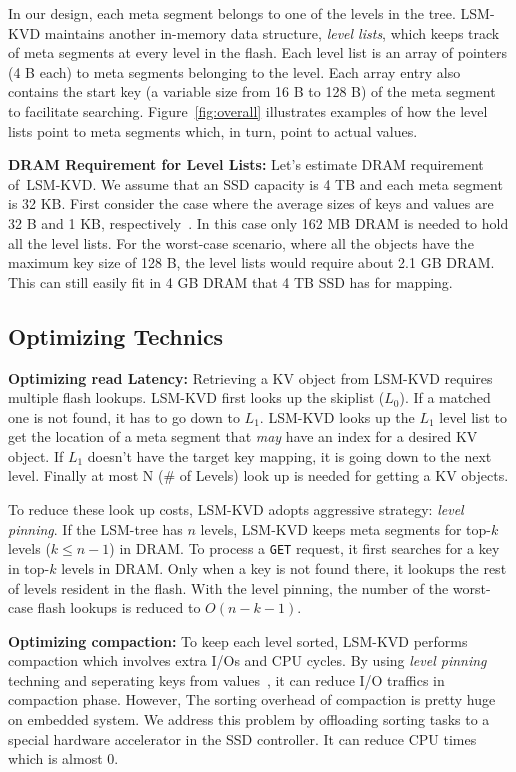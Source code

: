 \documentclass{abstract_hutech}
\newcommand{\ours}{LSM-KVD}
\begin{document}
In our design, each meta segment belongs to one of the levels in the tree.
\ours{} maintains another in-memory data structure, \textit{level lists}, which
keeps track of meta segments at every level in the flash.  Each level list is
an array of pointers (4 B each) to meta segments belonging to the level.  Each array
entry also contains the start key (a variable size from 16 B to 128 B) of the meta segment to facilitate searching.
Figure~\ref{fig:overall} illustrates examples of how the level lists point to
meta segments which, in turn, point to actual values.

\textbf{DRAM Requirement for Level Lists:}
Let's estimate DRAM requirement of~\ours{}.  We assume that an
SSD capacity is 4 TB and each meta segment is 32 KB. First 
consider the case where the average sizes of keys and values are 32 B and 1 KB,
respectively~\cite{kvsize}. In this case only 162 MB DRAM is needed to hold all the level lists.
For the
worst-case scenario, where all the objects have the maximum key size of 128 B,
the level lists would require about 2.1 GB DRAM.  This can still easily fit in
4 GB DRAM that 4 TB SSD has for mapping.

\subsection{Optimizing Technics}
\textbf{Optimizing read Latency:}
Retrieving a KV object from \ours{} requires multiple flash lookups. 
\ours{} first looks up the
skiplist ($L_0$). If a matched one is not found, it has to go down to
$L_1$. \ours{} looks up the $L_1$ level list to get the location of a meta
segment that \textit{may} have an index for a desired KV object. If $L_1$ doesn't have the target key mapping, it is going down to the next level. Finally at most N (\# of Levels) look up is needed for getting a KV objects.

To reduce these look up costs, \ours{} adopts aggressive strategy: \textit{level pinning}.  If the LSM-tree has $n$
levels, \ours{} keeps meta segments for top-$k$ levels ($k \le n-1$) in DRAM.
To process a \texttt{GET} request, it first searches for a key in top-$k$
levels in DRAM.  Only when a key is not found there, it lookups the rest
of levels resident in the flash.  With the level pinning, the number of the
worst-case flash lookups is reduced to $O(n-k-1)$. 

\textbf{Optimizing compaction:}
To keep each level sorted, \ours{} performs compaction which involves extra I/Os and CPU cycles.
By using \textit{level pinning} techning and seperating keys from values{~\cite{wisckey}}, it can reduce I/O traffics in compaction phase. 
However, The sorting overhead of compaction is pretty huge on embedded system. 
We address this problem by offloading sorting tasks to a special hardware accelerator in the SSD controller. It can reduce CPU times  which is almost 0.
\end{document}
